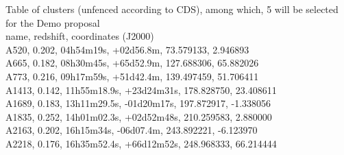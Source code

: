 \documentclass[10pt,a4paper,twoside,graphicx,color]{article}
\begin{document}
\def\pra{Phys.~Rev.~A}%
\def\prb{Phys.~Rev.~B}%
\def\prc{Phys.~Rev.~C}%
\def\prd{Phys.~Rev.~D}%
\def\pre{Phys.~Rev.~E}%
\def\prl{Phys.~Rev.~Lett.}%
\def\pasp{PASP}%
\def\pasj{PASJ}%
\def\qjras{QJRAS}%
\def\rmxaa{Rev. Mexicana Astron. Astrofis.}%
\def\skytel{S\&T}%
\def\solphys{Sol.~Phys.}%
\def\sovast{Soviet~Ast.}%
\def\ssr{Space~Sci.~Rev.}%
\def\zap{ZAp}%
\def\nat{Nature}%
\def\iaucirc{IAU~Circ.}%
\def\aplett{Astrophys.~Lett.}%
\def\apspr{Astrophys.~Space~Phys.~Res.}%
\def\bain{Bull.~Astron.~Inst.~Netherlands}%
\def\fcp{Fund.~Cosmic~Phys.}%
\def\gca{Geochim.~Cosmochim.~Acta}%
\def\grl{Geophys.~Res.~Lett.}%
\def\jcp{J.~Chem.~Phys.}%
\def\jgr{J.~Geophys.~Res.}%
\def\jqsrt{J.~Quant.~Spec.~Radiat.~Transf.}%
\def\memsai{Mem.~Soc.~Astron.~Italiana}%
\def\nphysa{Nucl.~Phys.~A}%
\def\physrep{Phys.~Rep.}%
\def\physscr{Phys.~Scr}%
\def\planss{Planet.~Space~Sci.}%
\def\procspie{Proc.~SPIE}%
\let\astap=\aap
\let\apjlett=\apjl
\let\apjsupp=\apjs
\let\applopt=\ao


Table of  clusters (unfenced according to CDS), among which, 5 will be selected for the Demo proposal\\
name, redshift, coordinates (J2000)\\
A520,  0.202, 04h54m19s,   +02d56.8m,	73.579133, 2.946893 \\
A665,  0.182, 08h30m45s,   +65d52.9m,	127.688306, 65.882026\\
A773,  0.216, 09h17m59s,   +51d42.4m,	139.497459, 51.706411\\
A1413, 0.142, 11h55m18.9s, +23d24m31s,	178.828750, 23.408611\\
A1689, 0.183, 13h11m29.5s, -01d20m17s,	197.872917, -1.338056\\
A1835, 0.252, 14h01m02.3s, +02d52m48s,	210.259583, 2.880000\\
A2163, 0.202, 16h15m34s,   -06d07.4m,   243.892221, -6.123970\\
A2218, 0.176, 16h35m52.4s, +66d12m52s,	248.968333, 66.214444\\
\end{document}
